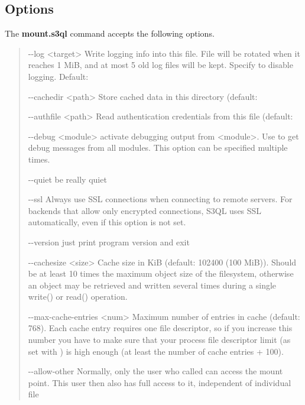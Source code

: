 \documentclass[letterpaper,10pt,english]{sphinxmanual}
\begin{document}
\subsection{Options}
\label{man/mount:options}
The \textbf{mount.s3ql} command accepts the following options.
\begin{quote}
\begin{optionlist}{3cm}
\item [-{-}log \textless{}target\textgreater{}]  
Write logging info into this file. File will be
rotated when it reaches 1 MiB, and at most 5 old log
files will be kept. Specify  to disable
logging. Default: 
\item [-{-}cachedir \textless{}path\textgreater{}]  
Store cached data in this directory (default:
\item [-{-}authfile \textless{}path\textgreater{}]  
Read authentication credentials from this file
(default: 
\item [-{-}debug \textless{}module\textgreater{}]  
activate debugging output from \textless{}module\textgreater{}. Use  to
get debug messages from all modules. This option can
be specified multiple times.
\item [-{-}quiet]  
be really quiet
\item [-{-}ssl]  
Always use SSL connections when connecting to remote
servers. For backends that allow only encrypted
connections, S3QL uses SSL automatically, even if this
option is not set.
\item [-{-}version]  
just print program version and exit
\item [-{-}cachesize \textless{}size\textgreater{}]  
Cache size in KiB (default: 102400 (100 MiB)). Should
be at least 10 times the maximum object size of the
filesystem, otherwise an object may be retrieved and
written several times during a single write() or
read() operation.
\item [-{-}max-cache-entries \textless{}num\textgreater{}]  
Maximum number of entries in cache (default: 768).
Each cache entry requires one file descriptor, so if
you increase this number you have to make sure that
your process file descriptor limit (as set with
) is high enough (at least the number of
cache entries + 100).
\item [-{-}allow-other]  
Normally, only the user who called  can
access the mount point. This user then also has full
access to it, independent of individual file

\end{optionlist}
\end{quote}
\end{document}
